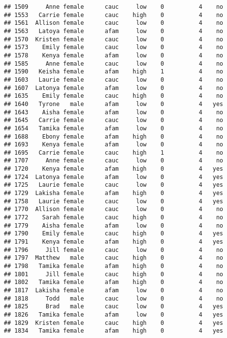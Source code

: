 \documentclass[
]{article}
\begin{document}
\begin{verbatim}
## 1509     Anne female      cauc     low    0          4    no
## 1553   Carrie female      cauc    high    0          4    no
## 1561  Allison female      cauc     low    0          4    no
## 1563   Latoya female      afam     low    0          4    no
## 1570  Kristen female      cauc     low    0          4    no
## 1573    Emily female      cauc     low    0          4    no
## 1578    Kenya female      afam     low    0          4    no
## 1585     Anne female      cauc     low    0          4    no
## 1590   Keisha female      afam    high    1          4    no
## 1603   Laurie female      cauc     low    0          4    no
## 1607  Latonya female      afam     low    0          4    no
## 1635    Emily female      cauc    high    0          4    no
## 1640   Tyrone   male      afam     low    0          4   yes
## 1643    Aisha female      afam     low    0          4    no
## 1645   Carrie female      cauc     low    0          4    no
## 1654   Tamika female      afam     low    0          4    no
## 1688    Ebony female      afam    high    0          4    no
## 1693    Kenya female      afam     low    0          4    no
## 1695   Carrie female      cauc    high    1          4    no
## 1707     Anne female      cauc     low    0          4    no
## 1720    Kenya female      afam    high    0          4   yes
## 1724  Latonya female      afam     low    0          4   yes
## 1725   Laurie female      cauc     low    0          4   yes
## 1729  Lakisha female      afam    high    0          4   yes
## 1758   Laurie female      cauc     low    0          4   yes
## 1770  Allison female      cauc     low    0          4    no
## 1772    Sarah female      cauc    high    0          4    no
## 1779    Aisha female      afam     low    0          4    no
## 1790    Emily female      cauc    high    0          4   yes
## 1791    Kenya female      afam    high    0          4   yes
## 1796     Jill female      cauc     low    0          4    no
## 1797  Matthew   male      cauc    high    0          4    no
## 1798   Tamika female      afam    high    0          4    no
## 1801     Jill female      cauc    high    0          4    no
## 1802   Tamika female      afam    high    0          4    no
## 1817  Lakisha female      afam     low    0          4    no
## 1818     Todd   male      cauc     low    0          4    no
## 1825     Brad   male      cauc     low    0          4   yes
## 1826   Tamika female      afam     low    0          4   yes
## 1829  Kristen female      cauc    high    0          4   yes
## 1834   Tamika female      afam    high    0          4   yes

\end{verbatim}
\end{document}
